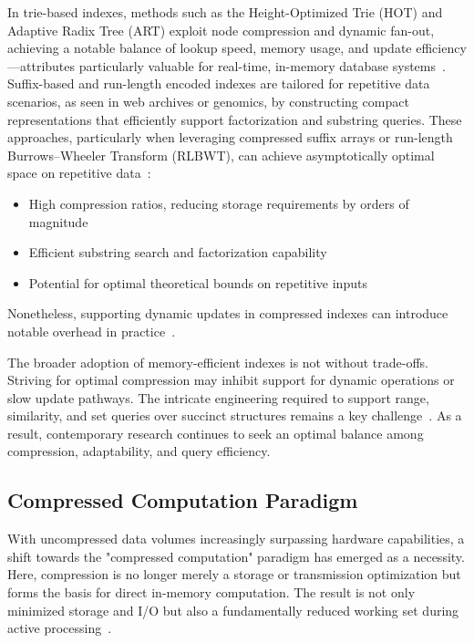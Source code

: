In trie-based indexes, methods such as the Height-Optimized Trie (HOT) and Adaptive Radix Tree (ART) exploit node compression and dynamic fan-out, achieving a notable balance of lookup speed, memory usage, and update efficiency—attributes particularly valuable for real-time, in-memory database systems~\cite{ref87,ref106,ref109}. Suffix-based and run-length encoded indexes are tailored for repetitive data scenarios, as seen in web archives or genomics, by constructing compact representations that efficiently support factorization and substring queries. These approaches, particularly when leveraging compressed suffix arrays or run-length Burrows–Wheeler Transform (RLBWT), can achieve asymptotically optimal space on repetitive data~\cite{ref108}:
\begin{itemize}
    \item High compression ratios, reducing storage requirements by orders of magnitude
    \item Efficient substring search and factorization capability
    \item Potential for optimal theoretical bounds on repetitive inputs
\end{itemize}
Nonetheless, supporting dynamic updates in compressed indexes can introduce notable overhead in practice~\cite{ref108,ref118}.

The broader adoption of memory-efficient indexes is not without trade-offs. Striving for optimal compression may inhibit support for dynamic operations or slow update pathways. The intricate engineering required to support range, similarity, and set queries over succinct structures remains a key challenge~\cite{ref109,ref118}. As a result, contemporary research continues to seek an optimal balance among compression, adaptability, and query efficiency.

\subsection{Compressed Computation Paradigm}

With uncompressed data volumes increasingly surpassing hardware capabilities, a shift towards the "compressed computation" paradigm has emerged as a necessity. Here, compression is no longer merely a storage or transmission optimization but forms the basis for direct in-memory computation. The result is not only minimized storage and I/O but also a fundamentally reduced working set during active processing~\cite{ref118}. 

